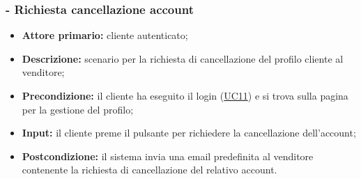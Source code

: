 \stepsubUserCase
\subsubsection{ - Richiesta cancellazione account}
\begin{itemize}
    \item \textbf{Attore primario:} cliente autenticato;
    \item \textbf{Descrizione:} scenario per la richiesta di cancellazione del profilo cliente al venditore;
    \item \textbf{Precondizione:} il cliente ha eseguito il login (\hyperref[UC11]{UC11}) e si trova sulla pagina per la gestione del profilo;
    \item \textbf{Input:} il cliente preme il pulsante per richiedere la cancellazione dell'account;
    \item \textbf{Postcondizione:} il sistema invia una email predefinita al venditore contenente la richiesta di cancellazione del relativo account.
\end{itemize}

\stepsubUserCase
